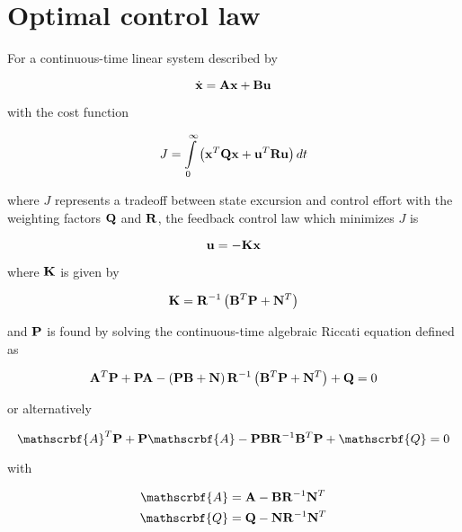 \section{Optimal control law}
\label{sec:deriv-optimal-control-law}

For a continuous-time linear system described by

\begin{equation}
  \dot{\mathbf{x}} = \mathbf{A}\mathbf{x} + \mathbf{B}\mathbf{u}
\end{equation}

with the cost function

\begin{equation*}
  J = \int\limits_0^\infty \left(\mathbf{x}^T\mathbf{Q}\mathbf{x} +
    \mathbf{u}^T\mathbf{R}\mathbf{u}\right) dt
\end{equation*}

where $J$ represents a tradeoff between \gls{state} excursion and control effort
with the weighting factors $\mathbf{Q}$ and $\mathbf{R}$, the feedback
\gls{control law} which minimizes $J$ is

\begin{equation*}
  \mathbf{u} = -\mathbf{K}\mathbf{x}
\end{equation*}

where $\mathbf{K}$ is given by

\begin{equation*}
  \mathbf{K} = \mathbf{R}^{-1} \left(\mathbf{B}^T\mathbf{P} + \mathbf{N}^T\right)
\end{equation*}

and $\mathbf{P}$ is found by solving the continuous-time algebraic Riccati equation
defined as

\begin{equation*}
  \mathbf{A}^T\mathbf{P} + \mathbf{P}\mathbf{A} - \left(\mathbf{P}\mathbf{B} +
    \mathbf{N}\right) \mathbf{R}^{-1} \left(\mathbf{B}^T\mathbf{P} + \mathbf{N}^T\right) +
    \mathbf{Q} = 0
\end{equation*}

or alternatively

\begin{equation*}
  \mathscrbf{A}^T\mtx{P} + \mtx{P}\mathscrbf{A} -
    \mtx{P}\mtx{B}\mtx{R}^{-1}\mtx{B}^T\mtx{P} + \mathscrbf{Q} = 0
\end{equation*}

with

\begin{align*}
  \mathscrbf{A} &= \mtx{A} - \mtx{B}\mtx{R}^{-1}\mtx{N}^T \\
  \mathscrbf{Q} &= \mtx{Q} - \mtx{N}\mtx{R}^{-1}\mtx{N}^T
\end{align*}

